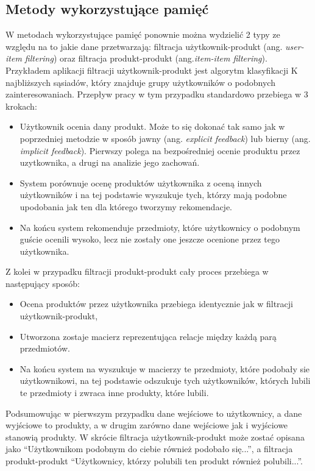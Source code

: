 \subsection{Metody wykorzystujące pamięć}
W metodach wykorzystujące pamięć ponownie można wydzielić 2 typy ze względu na to jakie dane przetwarzają: filtracja użytkownik-produkt (ang. \textit{user-item filtering}) oraz filtracja produkt-produkt (ang.\textit{item-item filtering}).
Przykładem aplikacji filtracji użytkownik-produkt jest algorytm klasyfikacji K najbliższych sąsiadów, który znajduje grupy użytkowników o podobnych zainteresowaniach. Przepływ pracy w tym przypadku standardowo przebiega w 3 krokach:
\begin{itemize}
    \item Użytkownik ocenia dany produkt. Może to się dokonać tak samo jak w poprzedniej metodzie w sposób jawny (ang. \textit{explicit feedback}) lub bierny (ang. \textit{implicit feedback}). Pierwszy polega na bezpośredniej ocenie produktu przez uzytkownika, a drugi na analizie jego zachowań.
    \item System porównuje ocenę produktów użytkownika z oceną innych użytkowników i na tej podstawie wyszukuje tych, którzy mają podobne upodobania jak ten dla którego tworzymy rekomendacje.
    \item Na końcu system rekomenduje przedmioty, które użytkownicy o podobnym guście ocenili wysoko, lecz nie zostały one jeszcze ocenione przez tego użytkownika.
\end{itemize}


Z kolei w przypadku filtracji produkt-produkt cały proces przebiega w następujący sposób:


\begin{itemize}
    \item Ocena produktów przez użytkownika przebiega identycznie jak w filtracji użytkownik-produkt,
    \item Utworzona zostaje macierz reprezentująca relacje między każdą parą przedmiotów.
    \item Na końcu system na wyszukuje w macierzy te przedmioty, które podobały sie użytkownikowi, na tej podstawie odszukuje tych użytkowników, których lubili te przedmioty i zwraca inne produkty, które lubili.
\end{itemize}
Podsumowując w pierwszym przypadku dane wejściowe to użytkownicy, a dane wyjściowe to produkty, a w drugim zarówno dane wejściowe jak i wyjściowe stanowią produkty. W skrócie filtracja użytkownik-produkt może zostać opisana jako “Użytkownikom podobnym do ciebie również podobało się...”, a filtracja produkt-produkt “Użytkownicy, którzy polubili ten produkt również polubili...”.

